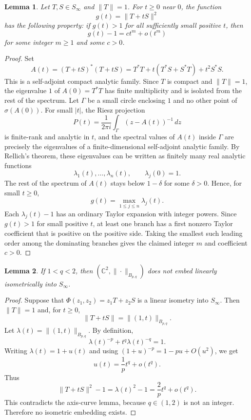 \documentclass[11pt]{article}
\newtheorem{lemma}{Lemma}
\newcommand{\C}{\mathbb C}
\newcommand{\Sinf}{S_\infty}
\begin{document}
\begin{lemma}
Let \(T,S\in \Sinf\) and \(\|T\|=1\).  For \(t\geq0\) near \(0\), the
function
\[
  g(t)=\|T+tS\|^2
\]
has the following property: if \(g(t)>1\) for all sufficiently small
positive \(t\), then
\[
  g(t)-1 = c t^m + o(t^m)
\]
for some integer \(m\geq1\) and some \(c>0\).
\end{lemma}

\begin{proof}
Set
\[
  A(t)=(T+tS)^*(T+tS)
      =T^*T+t(T^*S+S^*T)+t^2S^*S.
\]
This is a self-adjoint compact analytic family.  Since \(T\) is compact and
\(\|T\|=1\), the eigenvalue \(1\) of \(A(0)=T^*T\) has finite multiplicity
and is isolated from the rest of the spectrum.  Let \(\Gamma\) be a small
circle enclosing \(1\) and no other point of \(\sigma(A(0))\).  For small
\(|t|\), the Riesz projection
\[
  P(t)=\frac{1}{2\pi i}\int_\Gamma (z-A(t))^{-1}\,dz
\]
is finite-rank and analytic in \(t\), and the spectral values of \(A(t)\)
inside \(\Gamma\) are precisely the eigenvalues of a finite-dimensional
self-adjoint analytic family.  By Rellich's theorem, these eigenvalues can
be written as finitely many real analytic functions
\[
  \lambda_1(t),\ldots,\lambda_n(t),\qquad \lambda_j(0)=1.
\]
The rest of the spectrum of \(A(t)\) stays below \(1-\delta\) for some
\(\delta>0\).  Hence, for small \(t\geq0\),
\[
  g(t)=\max_{1\leq j\leq n}\lambda_j(t).
\]
Each \(\lambda_j(t)-1\) has an ordinary Taylor expansion with integer
powers.  Since \(g(t)>1\) for small positive \(t\), at least one branch has
a first nonzero Taylor coefficient that is positive on the positive side.
Taking the smallest such leading order among the dominating branches gives
the claimed integer \(m\) and coefficient \(c>0\).
\end{proof}

\begin{lemma}
If \(1<q<2\), then
\((\C^2,\|\cdot\|_{B_{p,q}})\) does not embed linearly isometrically into
\(\Sinf\).
\end{lemma}

\begin{proof}
Suppose that \(\Phi(z_1,z_2)=z_1T+z_2S\) is a linear isometry into
\(\Sinf\).  Then \(\|T\|=1\) and, for \(t\geq0\),
\[
  \|T+tS\|=\|(1,t)\|_{B_{p,q}}.
\]
Let \(\lambda(t)=\|(1,t)\|_{B_{p,q}}\).  By definition,
\[
  \lambda(t)^{-p}+t^q\lambda(t)^{-q}=1.
\]
Writing \(\lambda(t)=1+u(t)\) and using
\((1+u)^{-p}=1-pu+O(u^2)\), we get
\[
  u(t)=\frac{1}{p}t^q+o(t^q).
\]
Thus
\[
  \|T+tS\|^2-1=\lambda(t)^2-1
  =\frac{2}{p}t^q+o(t^q).
\]
This contradicts the axis-curve lemma, because \(q\in(1,2)\) is not an
integer.  Therefore no isometric embedding exists.
\end{proof}
\end{document}
